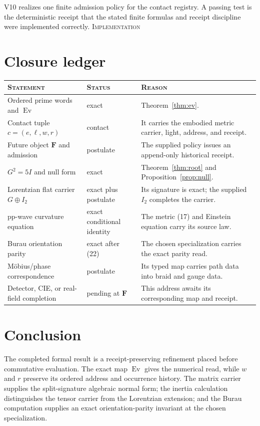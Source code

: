 \documentclass[10pt]{article}
\theoremstyle{remark}
\newcommand{\Ev}{\operatorname{Ev}}
\newcommand{\cstatus}[1]{\hfill\textsc{#1}}
\newcommand{\implementation}{\textsc{Implementation}}
\begin{document}
V10 realizes one finite admission policy for the contact registry.  A passing
test is the deterministic receipt that the stated finite formulas and receipt
discipline were implemented correctly. \cstatus{\implementation}

\section{Closure ledger}

\begin{center}
\begin{tabular}{@{}p{4.0cm}p{2.3cm}p{5.8cm}@{}}
\toprule
\textsc{Statement} & \textsc{Status} & \textsc{Reason}\\
\midrule
Ordered prime words and $\Ev$ & exact & Theorem~\ref{thm:ev}.\\
Contact tuple $c=(e,\ell,w,r)$ & contact & It carries the embodied metric carrier, light, address, and receipt.\\
Future object $\mathbf F$ and admission & postulate & The supplied policy issues an append-only historical receipt.\\
$G^2=5I$ and null form & exact & Theorem~\ref{thm:root} and Proposition~\ref{prop:null}.\\
Lorentzian flat carrier $G\oplus I_2$ & exact plus postulate & Its signature is exact; the supplied $I_2$ completes the carrier.\\
pp-wave curvature equation & exact conditional identity & The metric (17) and Einstein equation carry its source law.\\
Burau orientation parity & exact after (22) & The chosen specialization carries the exact parity read.\\
M\"obius/phase correspondence & postulate & Its typed map carries path data into braid and gauge data.\\
Detector, CIE, or real-field completion & pending at $\mathbf F$ & This address awaits its corresponding map and receipt.\\
\bottomrule
\end{tabular}
\end{center}

\section{Conclusion}

The completed formal result is a receipt-preserving refinement placed before
commutative evaluation.  The exact map $\Ev$ gives the numerical read, while
$w$ and $r$ preserve its ordered address and occurrence history.  The matrix
carrier supplies the split-signature algebraic normal form; the inertia
calculation distinguishes the tensor carrier from the Lorentzian extension;
and the Burau computation supplies an exact orientation-parity invariant at
the chosen specialization.
\end{document}
